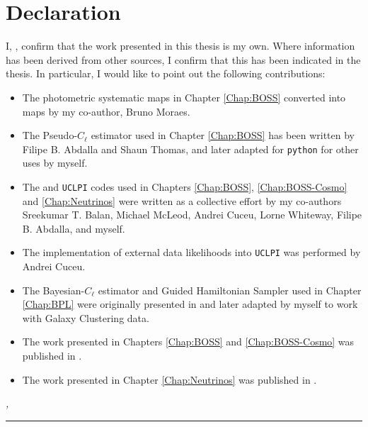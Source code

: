 %
\chapter*{Declaration}
\label{sec:declaration}
\thispagestyle{empty}

I, \thesisName , confirm that the work presented in this thesis is my own.
         Where information has been derived from other sources, I confirm that this has been indicated in the thesis. In particular, I would like to point out the following contributions:
\begin{itemize}
    \item The photometric systematic maps in Chapter \ref{Chap:BOSS} converted into \healpix maps by my co-author, Bruno Moraes.
    \item The Pseudo-$C_{\ell}$ estimator used in Chapter \ref{Chap:BOSS} has been written by Filipe B. Abdalla and Shaun Thomas, and later adapted for \texttt{python} for other uses by myself.
    \item The \uclcl and \texttt{UCLPI} codes used in Chapters \ref{Chap:BOSS}, \ref{Chap:BOSS-Cosmo} and \ref{Chap:Neutrinos} were written as a collective effort by my co-authors Sreekumar T. Balan, Michael McLeod, Andrei Cuceu, Lorne Whiteway, Filipe B. Abdalla, and myself.
    \item The implementation of external data likelihoods into \texttt{UCLPI} was performed by Andrei Cuceu.
    \item The Bayesian-$C_{\ell}$ estimator and Guided Hamiltonian Sampler used in Chapter \ref{Chap:BPL} were originally presented in \cite{SreeThesis} and later adapted by myself to work with Galaxy Clustering data.
    \item The work presented in Chapters \ref{Chap:BOSS} and \ref{Chap:BOSS-Cosmo} was published in \cite{2018LoureiroBOSS}.
    \item The work presented in Chapter \ref{Chap:Neutrinos} was published in \cite{2018LoureiroNeutrinos}.
\end{itemize}
         
\vspace*{\fill}

\noindent\textit{\thesisUniversityCity, \thesisDate}

\smallskip

\begin{flushright}
	\begin{minipage}{5cm}
		\rule{\textwidth}{1pt}
		\centering\thesisName
	\end{minipage}
\end{flushright}

